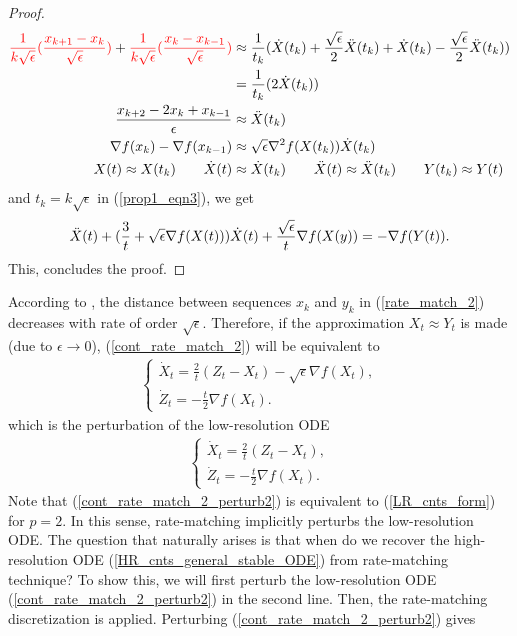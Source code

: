 \documentclass{article}
\theoremstyle{plain}
\theoremstyle{definition}
\theoremstyle{remark}
\begin{document}
\begin{proof}
\begin{align}
        \color{red}\frac{1}{k\sqrt{\epsilon}}(\frac{x_{k+1}-x_k}{\sqrt{\epsilon}})\color{black}+\color{red}\frac{1}{k\sqrt{\epsilon}}(\frac{x_k-x_{k-1}}{\sqrt{\epsilon}})&\approx \frac{1}{t_k}(\dot X(t_k)+\frac{\sqrt{\epsilon}}{2}\Ddot{X}(t_k)+ \dot X(t_k)-\frac{\sqrt{\epsilon}}{2}\Ddot{X}(t_k))\nonumber\\
        &=\frac{1}{t_k}(2 \dot X(t_k))\\
        \frac{x_{k+2}-2x_k+x_{k-1}}{\epsilon}&\approx \Ddot{X}(t_k)\\
        \nabla f(x_k)-\nabla f(x_{k-1})&\approx \sqrt{\epsilon}\nabla^2 f(X(t_k))\dot X(t_k)\\
        X(t)\approx X(t_k)\qquad \dot X(t)&\approx\dot X(t_k)\qquad \Ddot X(t)\approx\Ddot X(t_k) \qquad Y(t_k)\approx Y(t)
    \end{align}
    and $t_k=k\sqrt{\epsilon}$ in (\ref{prop1_eqn3}), we get
\begin{align}\label{prop1_eqn5}
    \Ddot{X}(t)+(\frac{3}{t}+\sqrt{\epsilon}\nabla f(X(t)))\dot X(t)+\frac{\sqrt{\epsilon}}{t}\nabla f(X(y))=-\nabla f(Y(t)).
\end{align}
This, concludes the proof.
\end{proof}
According to \cite{WibisonoE7351}, the distance between sequences $x_k$ and $y_k$ in (\ref{rate_match_2}) decreases with rate of order $\sqrt{\epsilon}$. Therefore, if the approximation $X_t\approx Y_t$ is made (due to $\epsilon\rightarrow 0$), (\ref{cont_rate_match_2}) will be equivalent to
\begin{align}\label{cont_rate_match_2_perturb}
    \left\{\begin{array}{l}
         \dot X_t = \frac{2}{t}(Z_t-X_t)-\sqrt{\epsilon}\nabla f(X_t),  \\
          \dot Z_t = -\frac{t}{2}\nabla f(X_t).
    \end{array}
    \right.
\end{align}
which is the perturbation of the low-resolution ODE
\begin{align}\label{cont_rate_match_2_perturb2}
    \left\{\begin{array}{l}
         \dot X_t = \frac{2}{t}(Z_t-X_t),  \\
          \dot Z_t = -\frac{t}{2}\nabla f(X_t).
    \end{array}
    \right.
\end{align}
Note that (\ref{cont_rate_match_2_perturb2}) is equivalent to (\ref{LR_cnts_form}) for $p=2$. In this sense, rate-matching implicitly perturbs the low-resolution ODE. The question that naturally arises is that when do we recover the high-resolution ODE (\ref{HR_cnts_general_stable_ODE}) from rate-matching technique? To show this, we will first perturb the low-resolution ODE (\ref{cont_rate_match_2_perturb2}) in the second line. Then, the rate-matching discretization is applied. Perturbing (\ref{cont_rate_match_2_perturb2}) gives
\end{document}
